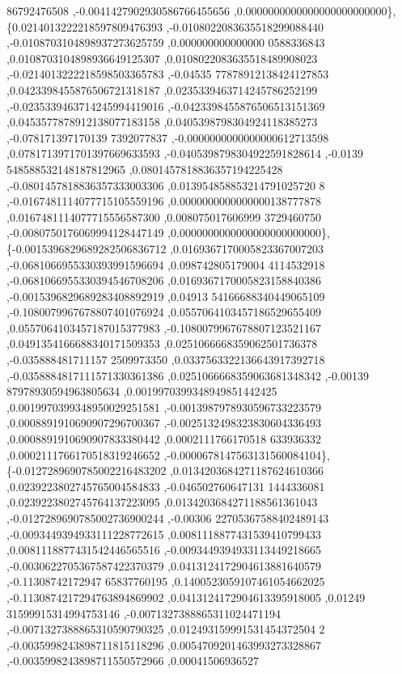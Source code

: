\begin{DoxyCode}
      86792476508 ,-0.0041427902930586766455656 ,0.0000000000000000000000000\},
\{0.0214013222218597809476393 ,-0.0108022083635518299088440 ,-0.0108703104898937273625759 ,0.000000000000000
      0588336843 ,0.0108703104898936649125307 ,0.0108022083635518489908023 ,-0.0214013222218598503365783 ,-0.04535
      77878912138424127853 ,0.0423398455876506721318187 ,0.0235339463714245786252199 ,-0.0235339463714245994419016
       ,-0.0423398455876506513151369 ,0.0453577878912138077183158 ,0.0405398798304924118385273 ,-0.078171397170139
      7392077837 ,-0.0000000000000000612713598 ,0.0781713971701397669633593 ,-0.0405398798304922591828614 ,-0.0139
      548588532148187812965 ,0.0801457818836357194225428 ,-0.0801457818836357333003306 ,0.013954858853214791025720
      8 ,-0.0167481114077715105559196 ,0.0000000000000000138777878 ,0.0167481114077715556587300 ,0.008075017606999
      3729460750 ,-0.0080750176069994128447149 ,0.0000000000000000000000000\},
\{-0.0015396829689282506836712 ,0.0169367170005823367007203 ,-0.0681066955330393991596694 ,0.098742805179004
      4114532918 ,-0.0681066955330394546708206 ,0.0169367170005823158840386 ,-0.0015396829689283408892919 ,0.04913
      54166688340449065109 ,-0.1080079967678807401076924 ,0.0557064103457186529655409 ,0.0557064103457187015377983
       ,-0.1080079967678807123521167 ,0.0491354166688340171509353 ,0.0251066668359062501736378 ,-0.035888481711157
      2509973350 ,0.0337563322136643917392718 ,-0.0358884817111571330361386 ,0.0251066668359063681348342 ,-0.00139
      87978930594963805634 ,0.0019970399348949851442425 ,0.0019970399348950029251581 ,-0.0013987978930596733223579
       ,0.0008891910690907296700367 ,-0.0025132498323830604336493 ,0.0008891910690907833380442 ,0.0002111766170518
      633936332 ,0.0002111766170518319246652 ,-0.0000678147563131560084104\},
\{-0.0127289690785002216483202 ,0.0134203684271187624610366 ,0.0239223802745765004584833 ,-0.046502760647131
      1444336081 ,0.0239223802745764137223095 ,0.0134203684271188561361043 ,-0.0127289690785002736900244 ,-0.00306
      22705367588402489143 ,-0.0093449394933111228772615 ,0.0081118877431539410799433 ,0.0081118877431542446565516
       ,-0.0093449394933113449218665 ,-0.0030622705367587422370379 ,0.0413124172904613881640579 ,-0.11308742172947
      65837760195 ,0.1400523059107461054662025 ,-0.1130874217294763894869902 ,0.0413124172904613395918005 ,0.01249
      31599915314994753146 ,-0.0071327388865311024471194 ,-0.0071327388865310590790325 ,0.012493159991531454372504
      2 ,-0.0035998243898711815118296 ,0.0054709201463993273328867 ,-0.0035998243898711550572966 ,0.00041506936527

\end{DoxyCode}
